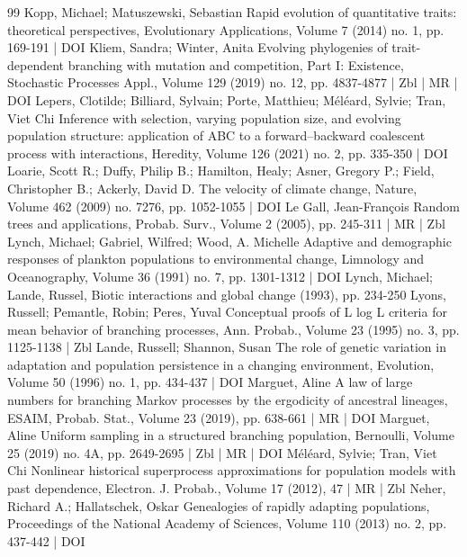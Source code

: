 \begin{thebibliography}{99}
Kopp, Michael; Matuszewski, Sebastian Rapid evolution of quantitative traits: theoretical perspectives, Evolutionary Applications, Volume 7 (2014) no. 1, pp. 169-191 | DOI
Kliem, Sandra; Winter, Anita Evolving phylogenies of trait-dependent branching with mutation and competition, Part I: Existence, Stochastic Processes Appl., Volume 129 (2019) no. 12, pp. 4837-4877 | Zbl | MR | DOI
Lepers, Clotilde; Billiard, Sylvain; Porte, Matthieu; Méléard, Sylvie; Tran, Viet Chi Inference with selection, varying population size, and evolving population structure: application of ABC to a forward–backward coalescent process with interactions, Heredity, Volume 126 (2021) no. 2, pp. 335-350 | DOI
Loarie, Scott R.; Duffy, Philip B.; Hamilton, Healy; Asner, Gregory P.; Field, Christopher B.; Ackerly, David D. The velocity of climate change, Nature, Volume 462 (2009) no. 7276, pp. 1052-1055 | DOI
Le Gall, Jean-François Random trees and applications, Probab. Surv., Volume 2 (2005), pp. 245-311 | MR | Zbl
Lynch, Michael; Gabriel, Wilfred; Wood, A. Michelle Adaptive and demographic responses of plankton populations to environmental change, Limnology and Oceanography, Volume 36 (1991) no. 7, pp. 1301-1312 | DOI
Lynch, Michael; Lande, Russel, Biotic interactions and global change (1993), pp. 234-250
Lyons, Russell; Pemantle, Robin; Peres, Yuval Conceptual proofs of L log L criteria for mean behavior of branching processes, Ann. Probab., Volume 23 (1995) no. 3, pp. 1125-1138 | Zbl
Lande, Russell; Shannon, Susan The role of genetic variation in adaptation and population persistence in a changing environment, Evolution, Volume 50 (1996) no. 1, pp. 434-437 | DOI
Marguet, Aline A law of large numbers for branching Markov processes by the ergodicity of ancestral lineages, ESAIM, Probab. Stat., Volume 23 (2019), pp. 638-661 | MR | DOI
Marguet, Aline Uniform sampling in a structured branching population, Bernoulli, Volume 25 (2019) no. 4A, pp. 2649-2695 | Zbl | MR | DOI
Méléard, Sylvie; Tran, Viet Chi Nonlinear historical superprocess approximations for population models with past dependence, Electron. J. Probab., Volume 17 (2012), 47 | MR | Zbl
Neher, Richard A.; Hallatschek, Oskar Genealogies of rapidly adapting populations, Proceedings of the National Academy of Sciences, Volume 110 (2013) no. 2, pp. 437-442 | DOI

\end{thebibliography}
